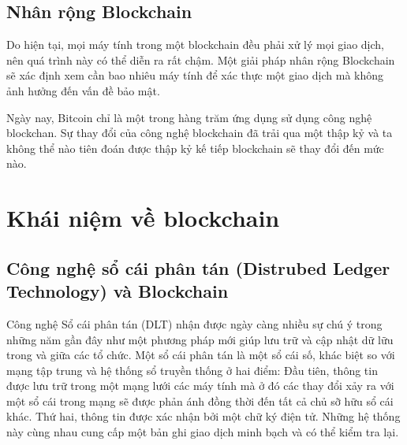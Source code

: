 \documentclass[12pt,a4paper]{article}
\begin{document}
\subsection{Nhân rộng Blockchain}
Do hiện tại, mọi máy tính trong một blockchain đều phải xử lý mọi giao dịch, nên quá trình này có thể diễn ra rất chậm. Một giải pháp nhân rộng Blockchain sẽ xác định xem cần bao nhiêu máy tính để xác thực một giao dịch mà không ảnh hưởng đến vấn đề bảo mật.

Ngày nay, Bitcoin chỉ là một trong hàng trăm ứng dụng sử dụng công nghệ blockchan. Sự thay đổi của công nghệ blockchain đã trải qua một thập kỷ và ta không thể nào tiên đoán được thập kỷ kế tiếp blockchain sẽ thay đổi đến mức nào.

\section{Khái niệm về blockchain}
\subsection{Công nghệ sổ cái phân tán (Distrubed Ledger Technology) và Blockchain}

%
%
%

Công nghệ Sổ cái phân tán (DLT) nhận được ngày càng nhiều sự chú ý trong những năm gần đây như một phương pháp mới giúp lưu trữ và cập nhật dữ lữu trong và giữa các tổ chức. Một sổ cái phân tán là một sổ cái số, khác biệt so với mạng tập trung và hệ thống sổ truyền thống ở hai điểm: Đầu tiên, thông tin được lưu trữ trong một mạng lưới các máy tính mà ở đó các thay đổi xảy ra với một sổ cái trong mạng sẽ được phản ánh đồng thời đến tất cả chủ sỡ hữu sổ cái khác. Thứ hai, thông tin được  xác nhận bởi một chữ ký điện tử. Những hệ thống này cùng nhau cung cấp một bản ghi giao dịch minh bạch và có thể kiểm tra lại. 
\end{document}
